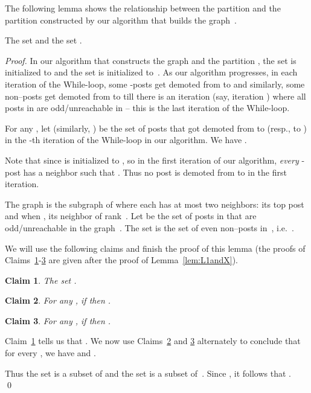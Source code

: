 \documentclass[11pt]{llncs}
\newtheorem{new-claim}{Claim}
\begin{document}
The following lemma shows the relationship between the partition  and the partition  constructed by our algorithm that builds the graph~.
\begin{lemma}
\label{lem:L1andX}
The set  and the set .\end{lemma}
\begin{proof}
In our algorithm that constructs the graph  and the partition , the 
set  is initialized to  and the set  is initialized to~. As our algorithm 
progresses, in each iteration of the While-loop, some -posts get demoted from  to  and similarly, 
some non--posts get demoted from  to  till there is an iteration (say, iteration ) where all 
posts in  are odd/unreachable in  -- this is the last iteration of the While-loop. 

For any ,  let  (similarly, ) be the set of posts that got 
demoted from  to  (resp.,  to ) in the -th iteration of the While-loop in our algorithm. We have .


Note that  since  is initialized to , so
in the first iteration of our algorithm, {\em every} -post  has a neighbor  such that . 
Thus no post is demoted from  to  in the first iteration. 

The graph  is the subgraph of  where each  has at most two neighbors: 
its top post and when , its neighbor of rank~. 
Let  be the set of posts in  that are odd/unreachable in the graph~. 
The set  is the set of even non--posts in~,
i.e.\ . 

We will use the following claims and finish the proof of this lemma
(the proofs of Claims~\ref{lemma-T}-\ref{lem:Z1} are given after the proof of Lemma~\ref{lem:L1andX}).


\begin{new-claim}
\label{lemma-T}
The set .
\end{new-claim}

\begin{new-claim}
\label{lem:F1}
For any , if  then .
\end{new-claim}


\begin{new-claim}
\label{lem:Z1}
For any , if  then . 
\end{new-claim}

Claim~\ref{lemma-T} tells us that . We now use Claims~\ref{lem:F1} and \ref{lem:Z1} 
alternately to conclude that for
every , we have  and .

\smallskip

Thus the set  is a subset of  and the set  
is a subset of~. Since , it follows that . \qed
\end{proof}
\end{document}
